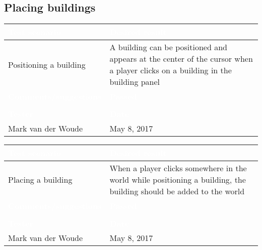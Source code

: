 \subsection{Placing buildings}

\begin{tabularx}{\textwidth}{|X|X|}
\hline
\rowcolor{lightgray}\textcolor{white}{\textbf{Test scenario}} &
\textcolor{white}{\textbf{Desired result}}       
\\\hline
Positioning a building & A building can be positioned and appears at the center of the cursor when a player clicks on a building in the building panel
\\\hline
\rowcolor{lightgray}\textcolor{white}{\textbf{Comments/suggestions}} & 
\textcolor{white}{\textbf{Passed}}
\\\hline
 & \cellcolor{green}                       
\\\hline
\rowcolor{lightgray}\textcolor{white}{\textbf{Tester}} & 
\textcolor{white}{\textbf{Date}}               
\\\hline
Mark van der Woude & May 8, 2017                               		 
\\\hline
\end{tabularx}

\begin{tabularx}{\textwidth}{|X|X|}
\hline
\rowcolor{lightgray}\textcolor{white}{\textbf{Test scenario}} &
\textcolor{white}{\textbf{Desired result}}       
\\\hline
Placing a building &
When a player clicks somewhere in the world while positioning a building, the building should be added to the world       
\\\hline
\rowcolor{lightgray}\textcolor{white}{\textbf{Comments/suggestions}} & 
\textcolor{white}{\textbf{Passed}}
\\\hline
 & \cellcolor{green}                       
\\\hline
\rowcolor{lightgray}\textcolor{white}{\textbf{Tester}} & 
\textcolor{white}{\textbf{Date}}               
\\\hline
Mark van der Woude & May 8, 2017                               		 
\\\hline
\end{tabularx}

